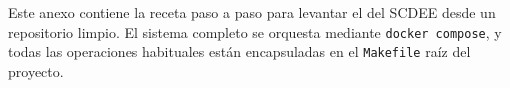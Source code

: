 Este anexo contiene la receta paso a paso para levantar el
 del SCDEE desde un repositorio limpio. El sistema completo
se orquesta mediante \texttt{docker compose}, y todas las operaciones
habituales están encapsuladas en el \texttt{Makefile} raíz del proyecto.
